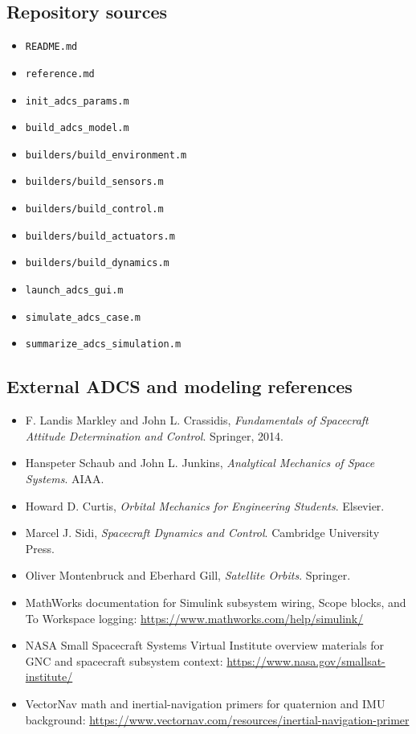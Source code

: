 \documentclass[11pt]{article}
\begin{document}
\subsection*{Repository sources}

\begin{itemize}
\item \texttt{README.md}
\item \texttt{reference.md}
\item \texttt{init\_adcs\_params.m}
\item \texttt{build\_adcs\_model.m}
\item \texttt{builders/build\_environment.m}
\item \texttt{builders/build\_sensors.m}
\item \texttt{builders/build\_control.m}
\item \texttt{builders/build\_actuators.m}
\item \texttt{builders/build\_dynamics.m}
\item \texttt{launch\_adcs\_gui.m}
\item \texttt{simulate\_adcs\_case.m}
\item \texttt{summarize\_adcs\_simulation.m}
\end{itemize}

\subsection*{External ADCS and modeling references}

\begin{itemize}
\item F. Landis Markley and John L. Crassidis, \textit{Fundamentals of Spacecraft Attitude Determination and Control}. Springer, 2014.
\item Hanspeter Schaub and John L. Junkins, \textit{Analytical Mechanics of Space Systems}. AIAA.
\item Howard D. Curtis, \textit{Orbital Mechanics for Engineering Students}. Elsevier.
\item Marcel J. Sidi, \textit{Spacecraft Dynamics and Control}. Cambridge University Press.
\item Oliver Montenbruck and Eberhard Gill, \textit{Satellite Orbits}. Springer.
\item MathWorks documentation for Simulink subsystem wiring, Scope blocks, and To Workspace logging: \url{https://www.mathworks.com/help/simulink/}
\item NASA Small Spacecraft Systems Virtual Institute overview materials for GNC and spacecraft subsystem context: \url{https://www.nasa.gov/smallsat-institute/}
\item VectorNav math and inertial-navigation primers for quaternion and IMU background: \url{https://www.vectornav.com/resources/inertial-navigation-primer}
\end{itemize}
\end{document}

